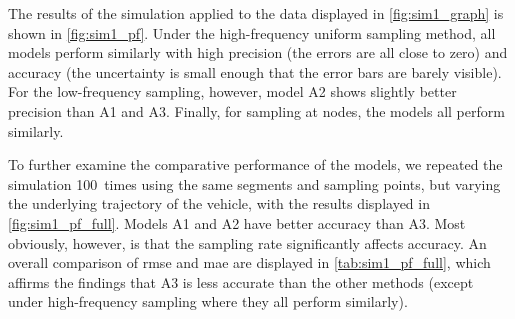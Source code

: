 The results of the simulation applied to the data displayed in \cref{fig:sim1_graph} is shown in \cref{fig:sim1_pf}. Under the high-frequency uniform sampling method, all models perform similarly with high precision (the errors are all close to zero) and accuracy (the uncertainty is small enough that the error bars are barely visible). For the low-frequency sampling, however, model A2 shows slightly better precision than A1 and A3. Finally, for sampling at nodes, the models all perform similarly.



To further examine the comparative performance of the models, we repeated the simulation 100~times using the same segments and sampling points, but varying the underlying trajectory of the vehicle, with the results displayed in \cref{fig:sim1_pf_full}. Models A1 and A2 have better accuracy than A3. Most obviously, however, is that the sampling rate significantly affects accuracy. An overall comparison of \gls{rmse} and \gls{mae} are displayed in \cref{tab:sim1_pf_full}, which affirms the findings that A3 is less accurate than the other methods  (except under high-frequency sampling where they all perform similarly).


